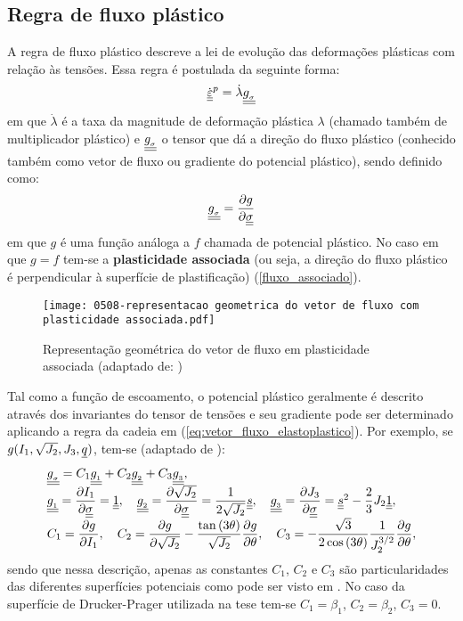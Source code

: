 \subsection{Regra de fluxo plástico}

A regra de fluxo plástico descreve a lei de evolução das deformações plásticas com relação às tensões. Essa regra é postulada da seguinte forma:
\begin{equation}
	\label{eq:fluxo_elastoplastico}
	\dot {\underline{\underline \varepsilon}}^p = \dot \lambda \underline{\underline {g_{_\sigma}}}
\end{equation}
em que $\dot \lambda$ é a taxa da magnitude de deformação plástica $\lambda$ (chamado também de multiplicador plástico) e $\underline{\underline {g_{_\sigma}}}$ o tensor que dá a direção do fluxo plástico (conhecido também como vetor de fluxo ou gradiente do potencial plástico), sendo definido como:
\begin{equation}
	\label{eq:vetor_fluxo_elastoplastico}
	\underline{\underline {g_{_\sigma}}} = \dfrac{\partial g}{\partial \underline{\underline \sigma}}
\end{equation}
em que $g$ é uma função análoga a $f$ chamada de potencial plástico. No caso em que $g=f$ tem-se a \textbf{plasticidade associada} (ou seja, a direção do fluxo plástico é perpendicular à superfície de plastificação) (\autoref{fluxo_associado}).
\begin{figure}[H]
	\begin{center}
		\texttt{[image: 0508-representacao geometrica do vetor de fluxo com plasticidade associada.pdf]}
	\end{center}
	\caption{\label{fluxo_associado}Representação geométrica do vetor de fluxo em plasticidade associada (adaptado de: )}
\end{figure}
Tal como a função de escoamento, o potencial plástico geralmente é descrito através dos invariantes do tensor de tensões e seu gradiente pode ser determinado aplicando a regra da cadeia em (\ref{eq:vetor_fluxo_elastoplastico}). Por exemplo, se $g(I_1,\sqrt{J_2},J_3,\underline q)$, tem-se (adaptado de ):
\begin{equation}
	\label{eq:invariantes_tensores}
	\begin{array}{lcl}
		\underline{\underline {g_{_\sigma}}} = C_1\underline{\underline {g_{_1}}} + C_2\underline{\underline {g_{_2}}} + C_3\underline{\underline {g_{_3}}}, \\ 
		\underline{\underline {g_{_1}}} = \dfrac{\partial I_1}{\partial \underline{\underline \sigma}} = \underline{\underline 1},~~~ \underline{\underline {g_{_2}}} = \dfrac{\partial \sqrt{J_2}}{\partial \underline{\underline \sigma}} = \dfrac{1}{2\sqrt{J_2}}\underline{\underline s},~~~ \underline{\underline {g_{_3}}} = \dfrac{\partial J_3}{\partial \underline{\underline \sigma}} = \underline{\underline s}^2-\dfrac{2}{3}J_2\underline{\underline 1}, \\
		C_1 = \dfrac{\partial g}{\partial I_1},~~~C_2=\dfrac{\partial g}{\partial \sqrt{J_2}}-\dfrac{\tan{(3\theta)}}{\sqrt{J_2}}\dfrac{\partial g}{\partial \theta},~~~C_3 = -\dfrac{\sqrt{3}}{2\cos{(3\theta})}\dfrac{1}{J_2^{3/2}}\dfrac{\partial g}{\partial \theta},
	\end{array}
\end{equation}
sendo que nessa descrição, apenas as constantes $C_1$, $C_2$  e $C_3$ são particularidades das diferentes superfícies potenciais como pode ser visto em . No caso da superfície de Drucker-Prager utilizada na tese tem-se $C_1 = \beta_1$, $C_2 = \beta_2$, $C_3 = 0$. 

